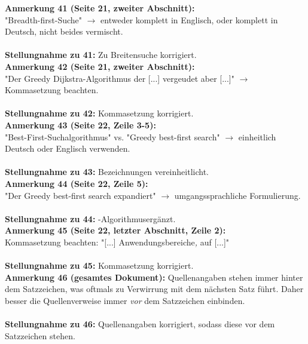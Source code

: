 \documentclass[a4paper,12pt]{book}
\begin{document}
\noindent
\textbf{Anmerkung 41 (Seite 21, zweiter Abschnitt):}\\
"Breadth-first-Suche" $\rightarrow$ entweder komplett in Englisch, oder komplett in Deutsch, nicht beides vermischt. \\
\\
\textbf{Stellungnahme zu 41:}
Zu \glqq Breitensuche \grqq korrigiert.
\\

\noindent
\textbf{Anmerkung 42 (Seite 21, zweiter Abschnitt):}\\
"Der Greedy Dijkstra-Algorithmus der [...] vergeudet aber [...]" $\rightarrow$ Kommasetzung beachten. \\
\\
\textbf{Stellungnahme zu 42:}
Kommasetzung korrigiert.
\\

\noindent
\textbf{Anmerkung 43 (Seite 22, Zeile 3-5):}\\
"Best-First-Suchalgorithmus" vs. "Greedy best-first search" $\rightarrow$ einheitlich Deutsch oder Englisch verwenden. \\
\\
\textbf{Stellungnahme zu 43:}
Bezeichnungen vereinheitlicht.
\\

\noindent
\textbf{Anmerkung 44 (Seite 22, Zeile 5):}\\
"Der Greedy best-first search expandiert" $\rightarrow$ umgangssprachliche Formulierung. \\
\\
\textbf{Stellungnahme zu 44:}
\glqq-Algorithmus\grqq ergänzt.
\\

\noindent
\textbf{Anmerkung 45 (Seite 22, letzter Abschnitt, Zeile 2):}\\
Kommasetzung beachten: "[...] Anwendungsbereiche\emph{,} auf [...]" \\
\\
\textbf{Stellungnahme zu 45:}
Kommasetzung korrigiert.
\\

\noindent
\textbf{Anmerkung 46 (gesamtes Dokument):}
Quellenangaben stehen immer hinter dem Satzzeichen, was oftmals zu Verwirrung mit dem nächsten Satz führt. Daher besser die Quellenverweise immer \emph{vor} dem Satzzeichen einbinden. \\
\\
\textbf{Stellungnahme zu 46:}
Quellenangaben korrigiert, sodass diese vor dem Satzzeichen stehen.
\\
\end{document}
